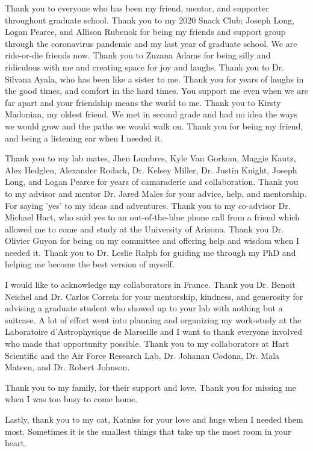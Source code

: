 
Thank you to everyone who has been my friend, mentor, and supporter throughout graduate school. Thank you to my 2020 Snack Club; Joseph Long, Logan Pearce, and Allison Rubenok for being my friends and support group through the coronavirus pandemic and my last year of graduate school. We are ride-or-die friends now. Thank you to Zuzana Adams for being silly and ridiculous with me and creating space for joy and laughs. Thank you to Dr. Silvana Ayala, who has been like a sister to me. Thank you for years of laughs in the good times, and comfort in the hard times. You support me even when we are far apart and your friendship means the world to me. Thank you to Kirsty Madonian, my oldest friend. We met in second grade and had no idea the ways we would grow and the paths we would walk on. Thank you for being my friend, and being a listening ear when I needed it.  

Thank you to my lab mates, Jhen Lumbres, Kyle Van Gorkom, Maggie Kautz, Alex Hedglen, Alexander Rodack, Dr. Kelsey Miller, Dr. Justin Knight, Joseph Long, and Logan Pearce for years of camaraderie and collaboration. Thank you to my advisor and mentor Dr. Jared Males for your advice, help, and mentorship. For saying 'yes' to my ideas and adventures. Thank you to my co-advisor Dr. Michael Hart, who said yes to an out-of-the-blue phone call from a friend which allowed me to come and study at the University of Arizona. Thank you Dr. Olivier Guyon for being on my committee and offering help and wisdom when I needed it. Thank you to Dr. Leslie Ralph for guiding me through my PhD and helping me become the best version of myself. 

I would like to acknowledge my collaborators in France. Thank you Dr. Benoit Neichel and Dr. Carlos Correia for your mentorship, kindness, and generosity for advising a graduate student who showed up to your lab with nothing but a suitcase. A lot of effort went into planning and organizing my work-study at the Laboratoire d'Astrophysique de Marseille and I want to thank everyone involved who made that opportunity possible. Thank you to my collaborators at Hart Scientific and the Air Force Research Lab, Dr. Johanan Codona, Dr. Mala Mateen, and Dr. Robert Johnson.

Thank you to my family, for their support and love. Thank you for missing me when I was too busy to come home.

Lastly, thank you to my cat, Katniss for your love and hugs when I needed them most. Sometimes it is the smallest things that take up the most room in your heart. 

